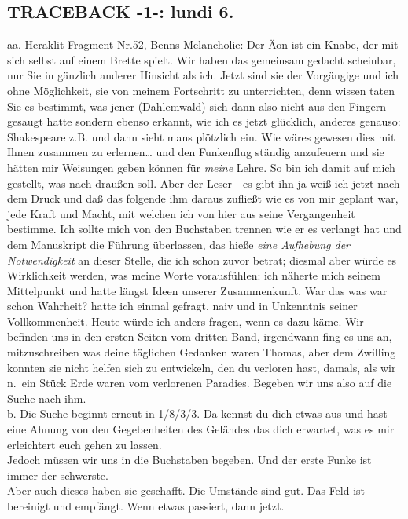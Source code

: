 \documentclass[
]{article}
\author{}
\date{\vspace{-2.5em}}
\begin{document}
\subsection{TRACEBACK -1-: lundi 6.}\label{traceback--1--lundi-6.}

aa. Heraklit Fragment Nr.52, Benns Melancholie: Der Äon ist ein Knabe,
der mit sich selbst auf einem Brette spielt. Wir haben das gemeinsam
gedacht scheinbar, nur Sie in gänzlich anderer Hinsicht als ich. Jetzt
sind sie der Vorgängige und ich ohne Möglichkeit, sie von meinem
Fortschritt zu unterrichten, denn wissen taten Sie es bestimmt, was
jener (Dahlemwald) sich dann also nicht aus den Fingern gesaugt hatte
sondern ebenso erkannt, wie ich es jetzt glücklich, anderes genauso:
Shakespeare z.B. und dann sieht mans plötzlich ein. Wie wäres gewesen
dies mit Ihnen zusammen zu erlernen\ldots{} und den Funkenflug ständig
anzufeuern und sie hätten mir Weisungen geben können für \emph{meine}
Lehre. So bin ich damit auf mich gestellt, was nach draußen soll. Aber
der Leser - es gibt ihn ja weiß ich jetzt nach dem Druck und daß das
folgende ihm daraus zufließt wie es von mir geplant war, jede Kraft und
Macht, mit welchen ich von hier aus seine Vergangenheit bestimme. Ich
sollte mich von den Buchstaben trennen wie er es verlangt hat und dem
Manuskript die Führung überlassen, das hieße \emph{eine Aufhebung der
Notwendigkeit} an dieser Stelle, die ich schon zuvor betrat; diesmal
aber würde es Wirklichkeit werden, was meine Worte vorausfühlen: ich
näherte mich seinem Mittelpunkt und hatte längst Ideen unserer
Zusammenkunft. War das was war schon Wahrheit? hatte ich einmal gefragt,
naiv und in Unkenntnis seiner Vollkommenheit. Heute würde ich anders
fragen, wenn es dazu käme. Wir befinden uns in den ersten Seiten vom
dritten Band, irgendwann fing es uns an, mitzuschreiben was deine
täglichen Gedanken waren Thomas, aber dem Zwilling konnten sie nicht
helfen sich zu entwickeln, den du verloren hast, damals, als wir n.~ein
Stück Erde waren vom verlorenen Paradies. Begeben wir uns also auf die
Suche nach ihm.\\
b. Die Suche beginnt erneut in 1/8/3/3. Da kennst du dich etwas aus und
hast eine Ahnung von den Gegebenheiten des Geländes das dich erwartet,
was es mir erleichtert euch gehen zu lassen.\\
Jedoch müssen wir uns in die Buchstaben begeben. Und der erste Funke ist
immer der schwerste.\\
Aber auch dieses haben sie geschafft. Die Umstände sind gut. Das Feld
ist bereinigt und empfängt. Wenn etwas passiert, dann jetzt.
\end{document}
